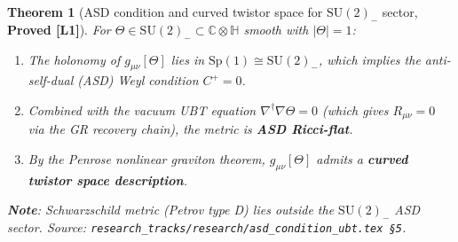 \documentclass[12pt]{article}
\newtheorem{theorem}{Theorem}[section]
\theoremstyle{definition}
\theoremstyle{remark}
\begin{document}
\begin{theorem}[ASD condition and curved twistor space for $\mathrm{SU}(2)_-$ sector,
                \textbf{Proved [L1]}]
\label{thm:asd_twistor_canonical}
For $\Theta \in \mathrm{SU}(2)_- \subset \mathbb{C}\otimes\mathbb{H}$ smooth
with $|\Theta|=1$:
\begin{enumerate}
  \item The holonomy of $g_{\mu\nu}[\Theta]$ lies in
        $\mathrm{Sp}(1) \cong \mathrm{SU}(2)_-$,
        which implies the anti-self-dual (ASD) Weyl condition $C^+ = 0$.
  \item Combined with the vacuum UBT equation $\nabla^\dagger\nabla\Theta = 0$
        (which gives $R_{\mu\nu} = 0$ via the GR recovery chain),
        the metric is \textbf{ASD Ricci-flat}.
  \item By the Penrose nonlinear graviton theorem, $g_{\mu\nu}[\Theta]$ admits
        a \textbf{curved twistor space description}.
\end{enumerate}
\textbf{Note}: Schwarzschild metric (Petrov type D) lies outside the
$\mathrm{SU}(2)_-$ ASD sector.
Source: \texttt{research\_tracks/research/asd\_condition\_ubt.tex §5}.
\end{theorem}

\ifdefined\INCLUDEMODE
\else
  
\end{document}
